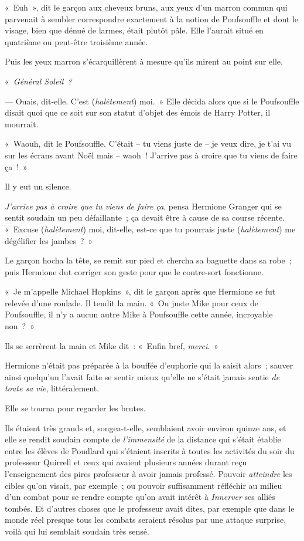 «~Euh~», dit le garçon aux cheveux bruns, aux yeux d'un marron commun qui parvenait à sembler correspondre exactement à la notion de Poufsouffle et dont le visage, bien que dénué de larmes, était plutôt pâle. Elle l'aurait situé en quatrième ou peut-être troisième année.

Puis les yeux marron s'écarquillèrent à mesure qu'ils mirent au point sur elle.

«~\emph{Général Soleil~?}

--- Ouais, dit-elle. C'est (\emph{halètement}) moi.~» Elle décida alors que si le Poufsouffle disait quoi que ce soit sur son statut d'objet des émois de Harry Potter, il mourrait.

«~Waouh, dit le Poufsouffle. C'était -- tu viens juste de -- je veux dire, je t'ai vu sur les écrans avant Noël mais -- waoh~! J'arrive pas à croire que tu viens de faire ça~!~»

Il y eut un silence.

\emph{J'arrive pas à croire que tu viens de faire ça}, pensa Hermione Granger qui se sentit soudain un peu défaillante~; ça devait être à cause de sa course récente. «~Excuse (\emph{halètement}) moi, dit-elle, est-ce que tu pourrais juste (\emph{halètement}) me dégélifier les jambes~?~»

Le garçon hocha la tête, se remit sur pied et chercha sa baguette dans sa robe~; puis Hermione dut corriger son geste pour que le contre-sort fonctionne.

«~Je m'appelle Michael Hopkins~», dit le garçon après que Hermione se fut relevée d'une roulade. Il tendit la main. «~Ou juste Mike pour ceux de Poufsouffle, il n'y a aucun autre Mike à Poufsouffle cette année, incroyable non~?~»

Ils se serrèrent la main et Mike dit~: «~Enfin bref, \emph{merci}.~»

Hermione n'était pas préparée à la bouffée d'euphorie qui la saisit alors~; sauver ainsi quelqu'un l'avait faite se sentir mieux qu'elle ne s'était jamais sentie \emph{de toute sa vie}, littéralement.

Elle se tourna pour regarder les brutes.

Ils étaient très grands et, songea-t-elle, semblaient avoir environ quinze ans, et elle se rendit soudain compte de \emph{l'immensité} de la distance qui s'était établie entre les élèves de Poudlard qui s'étaient inscrits à toutes les activités du soir du professeur Quirrell et ceux qui avaient plusieurs années durant reçu l'enseignement des pires professeur à avoir jamais professé. Pouvoir \emph{atteindre} les cibles qu'on visait, par exemple~; ou pouvoir suffisamment réfléchir au milieu d'un combat pour se rendre compte qu'on avait intérêt à \emph{Innerver} ses alliés tombés. Et d'autres choses que le professeur avait dites, par exemple que dans le monde réel presque tous les combats seraient résolus par une attaque surprise, voilà qui lui semblait soudain très sensé.

